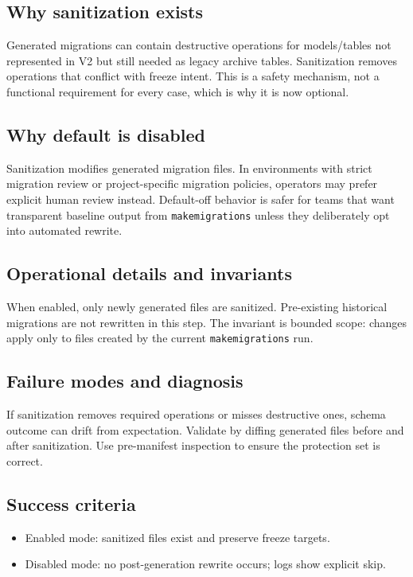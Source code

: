\documentclass[11pt,a4paper]{article}
\begin{document}
\subsection*{Why sanitization exists}
Generated migrations can contain destructive operations for models/tables not represented in
V2 but still needed as legacy archive tables. Sanitization removes operations that conflict
with freeze intent. This is a safety mechanism, not a functional requirement for every case,
which is why it is now optional.

\subsection*{Why default is disabled}
Sanitization modifies generated migration files. In environments with strict migration review
or project-specific migration policies, operators may prefer explicit human review instead.
Default-off behavior is safer for teams that want transparent baseline output from
\texttt{makemigrations} unless they deliberately opt into automated rewrite.

\subsection*{Operational details and invariants}
When enabled, only newly generated files are sanitized. Pre-existing historical migrations are
not rewritten in this step. The invariant is bounded scope: changes apply only to files
created by the current \texttt{makemigrations} run.

\subsection*{Failure modes and diagnosis}
If sanitization removes required operations or misses destructive ones, schema outcome can
drift from expectation. Validate by diffing generated files before and after sanitization.
Use pre-manifest inspection to ensure the protection set is correct.

\subsection*{Success criteria}
\begin{itemize}[leftmargin=1.5em]
  \item Enabled mode: sanitized files exist and preserve freeze targets.
  \item Disabled mode: no post-generation rewrite occurs; logs show explicit skip.
\end{itemize}
\end{document}
